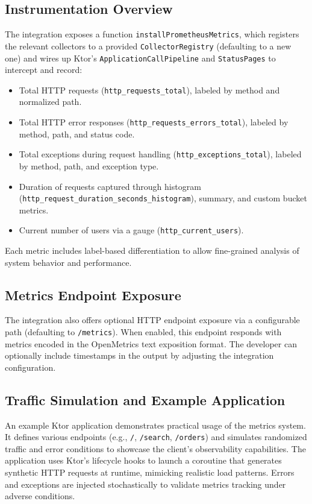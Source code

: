 \subsection*{Instrumentation Overview}
The integration exposes a function \texttt{installPrometheusMetrics}, which registers the relevant collectors to a provided \texttt{CollectorRegistry} (defaulting to a new one) and wires up Ktor's \texttt{ApplicationCallPipeline} and \texttt{StatusPages} to intercept and record:

\begin{itemize}
  \item Total HTTP requests (\texttt{http\_requests\_total}), labeled by method and normalized path.
  \item Total HTTP error responses (\texttt{http\_requests\_errors\_total}), labeled by method, path, and status code.
  \item Total exceptions during request handling (\texttt{http\_exceptions\_total}), labeled by method, path, and exception type.
  \item Duration of requests captured through histogram (\texttt{http\_request\_duration\_seconds\_histogram}), summary, and custom bucket metrics.
  \item Current number of users via a gauge (\texttt{http\_current\_users}).
\end{itemize}

Each metric includes label-based differentiation to allow fine-grained analysis of system behavior and performance.

\subsection*{Metrics Endpoint Exposure}
The integration also offers optional HTTP endpoint exposure via a configurable path (defaulting to \texttt{/metrics}). When enabled, this endpoint responds with metrics encoded in the OpenMetrics text exposition format. The developer can optionally include timestamps in the output by adjusting the integration configuration.

\subsection*{Traffic Simulation and Example Application}
An example Ktor application demonstrates practical usage of the metrics system. It defines various endpoints (e.g., \texttt{/}, \texttt{/search}, \texttt{/orders}) and simulates randomized traffic and error conditions to showcase the client's observability capabilities. The application uses Ktor's lifecycle hooks to launch a coroutine that generates synthetic HTTP requests at runtime, mimicking realistic load patterns. Errors and exceptions are injected stochastically to validate metrics tracking under adverse conditions.

